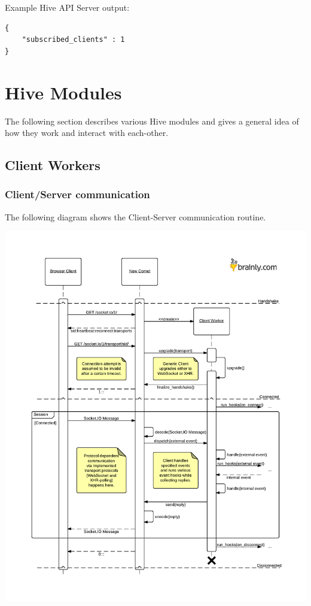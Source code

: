 \documentclass[a4paper]{article}
\begin{document}
\noindent
Example Hive API Server output:

\begin{verbatim}
{
    "subscribed_clients" : 1
}
\end{verbatim}




\pagebreak
\section{Hive Modules}
\label{sec-7}

The following section describes various Hive modules and gives a general idea of how they work and interact with each-other.
\subsection{Client Workers}
\label{sec-7-1}
\subsubsection{Client/Server communication}
\label{sec-7-1-1}

The following diagram shows the Client-Server communication routine.

\begin{center}
\includegraphics[scale=0.8]{./img/client_server.pdf}
\end{center}
\end{document}
